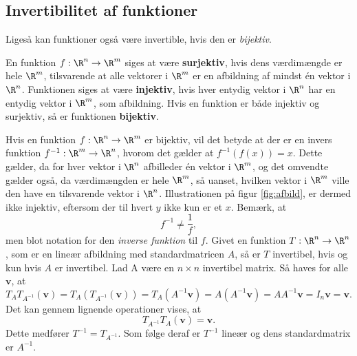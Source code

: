 %
%
\subsection{Invertibilitet af funktioner}
%
% 
Ligeså kan funktioner også være invertible, hvis den er \textit{bijektiv}.
%
\begin{defn}{}{}
En funktion $f:\R^n \rightarrow \R^m$ siges at være \textbf{surjektiv}, hvis dens værdimængde er hele $\R^m$, tilsvarende at alle vektorer i $\R^m$ er en afbildning af mindst én vektor i $\R^n$.
Funktionen siges at være \textbf{injektiv}, hvis hver entydig vektor i $\R^n$ har en entydig vektor i $\R^m$, som afbildning.
Hvis en funktion er både injektiv og surjektiv, så er funktionen \textbf{bijektiv}.
\end{defn}
\noindent
%
Hvis en funktion $f:\R^n \rightarrow \R^m$ er bijektiv, vil det betyde at der er en invers funktion $f^{-1}:\R^m \rightarrow \R^n$, hvorom det gælder at $f^{-1}(f(x))=x$. 
Dette gælder, da for hver vektor i $\R^n$ afbilleder én vektor i $\R^m$, og det omvendte gælder også, da værdimængden er hele $\R^m$, så uanset, hvilken vektor i $\R^m$ ville den have en tilsvarende vektor i $\R^n$.
%
Illustrationen på figur \ref{fig:afbild}, er dermed ikke injektiv, eftersom der til hvert $y$ ikke kun er et $x$. 
%
%
Bemærk, at
$$f^{-1} \neq \frac{1}{f},$$
men blot notation for den \textit{inverse funktion} til $f$.
Givet en funktion $T:\R^n \rightarrow \R^n$, som er en lineær afbildning med standardmatricen $A$, så er $T$ invertibel, hvis og kun hvis $A$ er invertibel. 
Lad A være en $n \times n$ invertibel matrix. 
Så haves for alle $\textbf{v}$, at
$$T_AT_{A^{-1}}(\textbf{v})=T_A(T_{A^{-1}}(\textbf{v}))=T_A(A^{-1}\textbf{v})=A(A^{-1}\textbf{v})=AA^{-1}\textbf{v}=I_n\textbf{v}=\textbf{v}.$$
Det kan gennem lignende operationer vises, at
$$T_{A^{-1}}T_A(\textbf{v})=\textbf{v}.$$
%
Dette medfører $T^{-1}=T_{A^{-1}}$. 
Som følge deraf er $T^{-1}$ lineær og dens standardmatrix er $A^{-1}$.
\\
%

